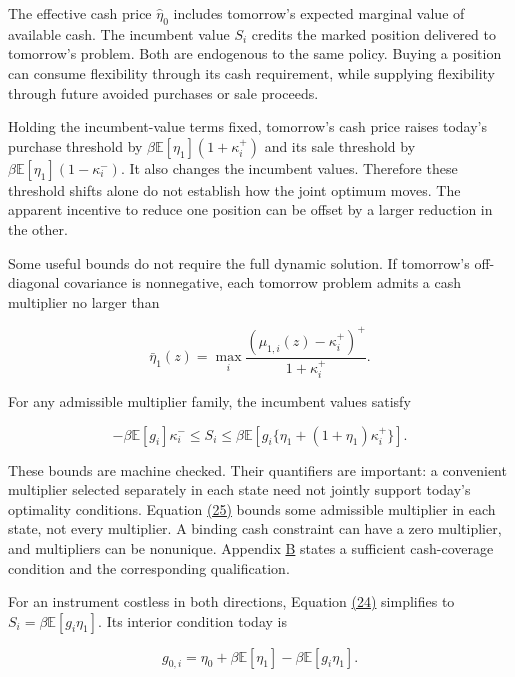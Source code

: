 \documentclass[11pt]{article}
\begin{document}
The effective cash price \(\hat\eta_0\) includes tomorrow's expected marginal value of available cash. The incumbent value \(S_i\) credits the marked position delivered to tomorrow's problem. Both are endogenous to the same policy. Buying a position can consume flexibility through its cash requirement, while supplying flexibility through future avoided purchases or sale proceeds.

Holding the incumbent-value terms fixed, tomorrow's cash price raises today's purchase threshold by \(\beta\mathbb E[\eta_1](1+\kappa_i^+)\) and its sale threshold by \(\beta\mathbb E[\eta_1](1-\kappa_i^-)\). It also changes the incumbent values. Therefore these threshold shifts alone do not establish how the joint optimum moves. The apparent incentive to reduce one position can be offset by a larger reduction in the other.

Some useful bounds do not require the full dynamic solution. If tomorrow's off-diagonal covariance is nonnegative, each tomorrow problem admits a cash multiplier no larger than

\begin{equation*}
\bar\eta_1(z)=\max_i\frac{(\mu_{1,i}(z)-\kappa_i^+)^+}{1+\kappa_i^+}.
\tag{25}\label{eq:25}
\end{equation*}

For any admissible multiplier family, the incumbent values satisfy

\begin{equation*}
-\beta\mathbb E[g_i]\kappa_i^-
\leq S_i\leq
\beta\mathbb E[g_i\{\eta_1+(1+\eta_1)\kappa_i^+\}].
\tag{26}\label{eq:26}
\end{equation*}

These bounds are machine checked. Their quantifiers are important: a convenient multiplier selected separately in each state need not jointly support today's optimality conditions. Equation \hyperref[eq:25]{(25)} bounds some admissible multiplier in each state, not every multiplier. A binding cash constraint can have a zero multiplier, and multipliers can be nonunique. Appendix \hyperref[sec:B]{B} states a sufficient cash-coverage condition and the corresponding qualification.

For an instrument costless in both directions, Equation \hyperref[eq:24]{(24)} simplifies to \(S_i=\beta\mathbb E[g_i\eta_1]\). Its interior condition today is

\begin{equation*}
g_{0,i}=\eta_0+\beta\mathbb E[\eta_1]-\beta\mathbb E[g_i\eta_1].
\tag{27}\label{eq:27}
\end{equation*}
\end{document}
